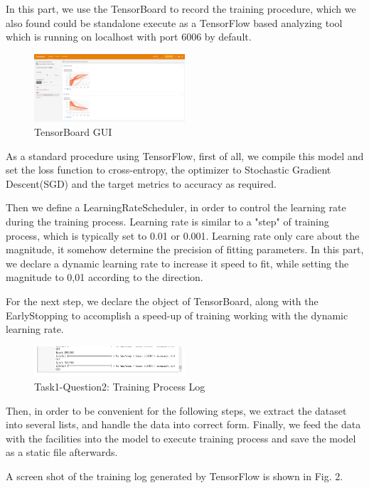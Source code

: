 \documentclass[conference]{IEEEtran}
\begin{document}
	In this part, we use the TensorBoard to record the training procedure, which we also found could be standalone execute as a TensorFlow based analyzing tool which is running on localhost with port 6006 by default.\par 
\begin{figure}[h] 
    \centering
    \includegraphics[width=0.5\textwidth]{tb.png}
    \caption{TensorBoard GUI} 
    \label{Fig.t3q2} 
\end{figure}
	As a standard procedure using TensorFlow, first of all, we compile this model and set the loss function to cross-entropy, the optimizer to Stochastic Gradient Descent(SGD) and the target metrics to accuracy as required. \par
	Then we define a LearningRateScheduler, in order to control the learning rate during the training process. Learning rate is similar to a "step" of training process, which is typically set to 0.01 or 0.001. Learning rate only care about the magnitude, it somehow determine the precision of fitting parameters. In this part, we declare a dynamic learning rate to increase it speed to fit, while setting the magnitude to 0,01 according to the direction.\par
	For the next step, we declare the object of TensorBoard, along with the EarlyStopping to accomplish a speed-up of training working with the dynamic learning rate.
	\begin{figure}[h] 
		\centering
		\includegraphics[width=0.5\textwidth]{T1Q2.png}
		\caption{Task1-Question2: Training Process Log} 
		\label{Fig.t1q2} 
	\end{figure}
	Then, in order to be convenient for the following steps, we extract the dataset into several lists, and handle the data into correct form. Finally, we feed the data with the facilities into the model to execute training process and save the model as a static file afterwards.\par
	A screen shot of the training log generated by TensorFlow is shown in Fig. 2.
	
\end{document}
